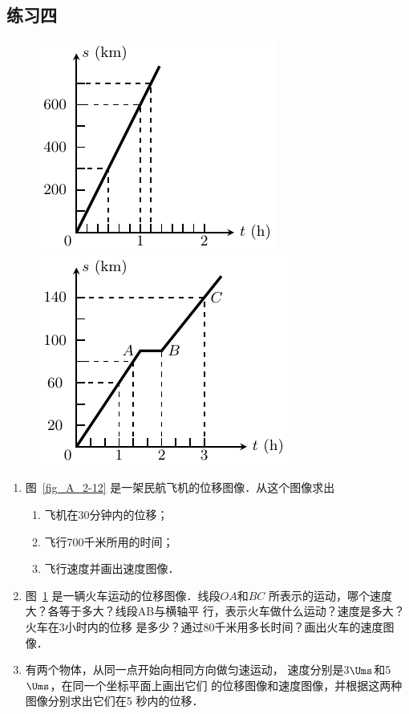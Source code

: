 \subsection*{练习四}
\begin{figure}[htp]
    \centering
    \begin{minipage}[t]{0.48\textwidth}
        \centering
        \includegraphics{fig/A/2-12.pdf}
        \caption{}\label{fig_A_2-12}
    \end{minipage}
    \begin{minipage}[t]{0.48\textwidth}
        \centering
        \includegraphics{fig/A/2-13.pdf}
        \caption{}\label{fig_A_2-13}
    \end{minipage}
\end{figure}

\begin{enumerate}
\item 
图~\ref{fig_A_2-12} 是一架民航飞机的位移图像．从这个图像求出
\begin{enumerate}
    \item 飞机在30分钟内的位移；
    \item 飞行700千米所用的时间；
    \item 飞行速度并画出速度图像．
\end{enumerate}

\item  
图~\ref{fig_A_2-13} 是一辆火车运动的位移图像．线段$OA$和$BC$
所表示的运动，哪个速度大？各等于多大？线段AB与横轴平
行，表示火车做什么运动？速度是多大？火车在3小时内的位移
是多少？通过80千米用多长时间？画出火车的速度图像．


\item  
有两个物体，从同一点开始向相同方向做匀速运动，
速度分别是3$\Ums$和5$\Ums$，在同一个坐标平面上画出它们
的位移图像和速度图像，并根据这两种图像分别求出它们在5
秒内的位移．

\end{enumerate}


